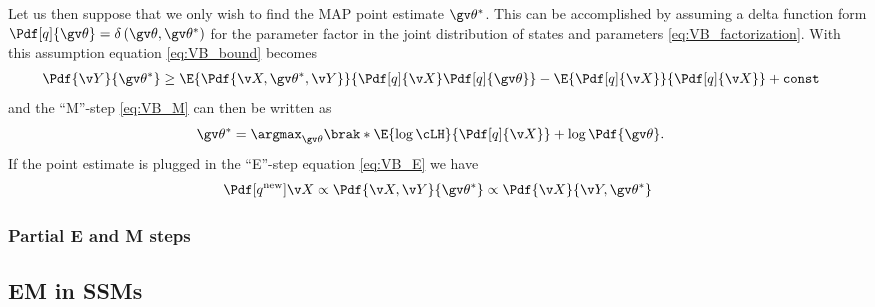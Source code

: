 Let us then suppose that we only wish to find the MAP point estimate $\Th^*$. This can be accomplished
by assuming a delta function form $\Pdf[q]{\Th}=\delta\left(\Th,\Th^*\right)$ for the parameter factor in the
joint distribution of states and parameters \eqref{eq:VB_factorization}.
With this assumption equation \eqref{eq:VB_bound} becomes
\begin{align}
	\Pdf{\Y}{\Th^*} &\geq \E{\Pdf{\X,\Th^*,\Y}}{\Pdf[q]{\X}\Pdf[q]{\Th}} - \E{\Pdf[q]{\X}}{\Pdf[q]{\X}} + \mathtt{const}
	\label{eq:VB_MAP_boundl}
\end{align}
and the ``M''-step \eqref{eq:VB_M} can then be written as
\begin{align}
	\Th^* &= \argmax_{\Th}\brak*{\E{\log\cLH}{\Pdf[q]{\X}}+\log\Pdf{\Th}}.	
\end{align}
If the point estimate is plugged in the ``E''-step equation \eqref{eq:VB_E} we have
\begin{align}
	\Pdf[q^{\text{new}}]{\X}\propto \Pdf{\X,\Y}{\Th^*} \propto \Pdf{\X}{\Y,\Th^*} 	
\end{align}

\subsubsection{Partial E and M steps}%

\parencite{Lange1995,Goodwin2005}

\subsection{EM in SSMs}%
\label{sec:EM_SSM}

